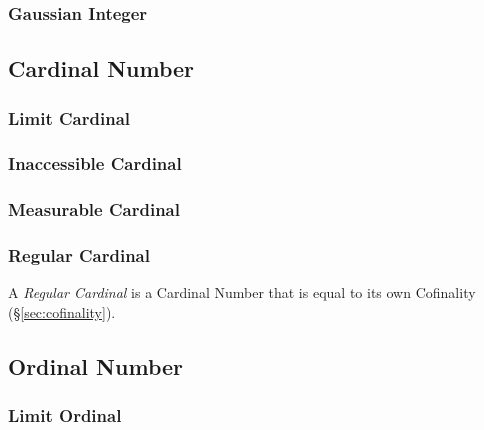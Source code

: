 \subsubsection{Gaussian Integer}\label{sec:gaussian_integer}



\subsection{Cardinal Number}\label{sec:cardinal_number}

\subsubsection{Limit Cardinal}\label{sec:limit_cardinal}

\subsubsection{Inaccessible Cardinal}\label{sec:inaccessible_cardinal}

\subsubsection{Measurable Cardinal}\label{sec:measurable_cardinal}

\subsubsection{Regular Cardinal}\label{sec:regular_cardinal}

A \emph{Regular Cardinal} is a Cardinal Number that is equal to its
own Cofinality (\S\ref{sec:cofinality}).



\subsection{Ordinal Number}\label{sec:ordinal_number}

\subsubsection{Limit Ordinal}\label{sec:limit_ordinal}

